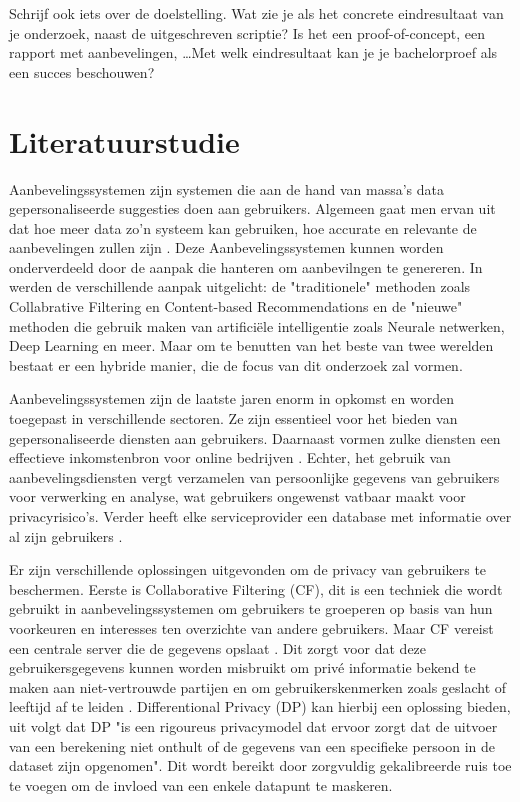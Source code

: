 Schrijf ook iets over de doelstelling. Wat zie je als het concrete eindresultaat van je onderzoek, naast de uitgeschreven scriptie? Is het een proof-of-concept, een rapport met aanbevelingen, \ldots Met welk eindresultaat kan je je bachelorproef als een succes beschouwen?

\section{Literatuurstudie}
\label{sec:literatuurstudie}

Aanbevelingssystemen zijn systemen die aan de hand van massa's data gepersonaliseerde suggesties doen aan gebruikers. Algemeen gaat men ervan uit dat hoe meer data zo'n systeem kan gebruiken, hoe accurate en relevante de aanbevelingen zullen zijn \autocite{Yang2020}. Deze Aanbevelingssystemen kunnen worden onderverdeeld door de aanpak die hanteren om aanbevilngen te genereren. In \textcite{Amatriain2014} werden de verschillende aanpak uitgelicht: de "traditionele" methoden zoals Collabrative Filtering en Content-based Recommendations en de "nieuwe" methoden die gebruik maken van artificiële intelligentie zoals Neurale netwerken, Deep Learning en meer. Maar om te benutten van het beste van twee werelden bestaat er een hybride manier, die de focus van dit onderzoek zal vormen.   

Aanbevelingssystemen zijn de laatste jaren enorm in opkomst en worden toegepast in verschillende sectoren. Ze zijn essentieel voor het bieden van gepersonaliseerde diensten aan gebruikers. Daarnaast vormen zulke diensten een effectieve inkomstenbron voor online bedrijven \autocite{Mazeh2020, Wang2018}. Echter, het gebruik van aanbevelingsdiensten vergt verzamelen van persoonlijke gegevens van gebruikers voor verwerking en analyse, wat gebruikers ongewenst vatbaar maakt voor privacyrisico's. Verder heeft elke serviceprovider een database met informatie over al zijn gebruikers \autocite{Wang2018, Lex2023, Yang2020, Friedman2015}.

Er zijn verschillende oplossingen uitgevonden om de privacy van gebruikers te beschermen. Eerste is Collaborative Filtering (CF), dit is een techniek die wordt gebruikt in aanbevelingssystemen om gebruikers te groeperen op basis van hun voorkeuren en interesses ten overzichte van andere gebruikers. Maar CF vereist een centrale server die de gegevens opslaat \autocite{Li2017,Wang2018}. Dit zorgt voor dat deze gebruikersgegevens kunnen worden misbruikt om privé informatie bekend te maken aan niet-vertrouwde partijen en om gebruikerskenmerken zoals geslacht of leeftijd af te leiden \autocite{Lex2023}. 
Differentional Privacy (DP) kan hierbij een oplossing bieden, uit \textcite{Friedman2015,Lex2023} volgt dat DP "is een rigoureus privacymodel dat ervoor zorgt dat de uitvoer van een berekening niet onthult of de gegevens van een specifieke persoon in de dataset zijn opgenomen". Dit wordt bereikt door zorgvuldig gekalibreerde ruis toe te voegen om de invloed van een enkele datapunt te maskeren.

